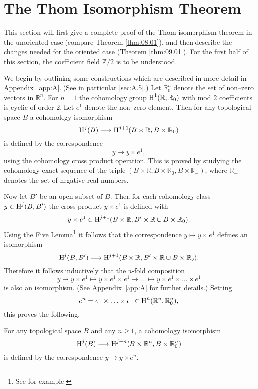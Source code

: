 \documentclass[../main]{subfiles}
\begin{document}
\chapter{The Thom Isomorphism Theorem}\label{ch:10}
This section will first give a complete proof of the Thom isomorphism theorem in the unoriented case (compare Theorem \ref{thm:08.01}), and then describe the changes needed for the oriented case (Theorem \ref{thm:09.01}). For the first half of this section, the coefficient field $\mathbb Z/2$ is to be understood.

We begin by outlining some constructions which are described in more detail in Appendix~\ref{app:A}. (See in particular \ref{sec:A.5}.) Let ${\mathbb R}^n_0$ denote the set of non--zero vectors in ${\mathbb R}^n$. For $n = 1$ the cohomology group $\operatorname{H}^1(\mathbb R, \mathbb R_0)$ with mod $2$ coefficients is cyclic of order $2$. Let $e^1$ denote the non--zero element. Then for any topological space $B$ a cohomology isomorphism \[\operatorname{H}^j(B) \longrightarrow \operatorname{H}^{j + 1}(B \times \mathbb R, B \times \mathbb R_0)\] is defined by the correspondence \[y \mapsto y \times e^1,\] using the cohomology cross product operation. This is proved by studying the cohomology exact sequence of the triple $(B \times \mathbb R, B \times \mathbb R_0, B \times \mathbb R_-)$, where $\mathbb R_-$ denotes the set of negative real numbers.

Now let $B'$ be an open subset of $B$. Then for each cohomology class \newline $y \in \operatorname{H}^j(B, B')$ the cross product $y \times e^1$ is defined with
\[y \times e^1 \in \operatorname{H}^{j + 1}(B \times \mathbb R, B' \times \mathbb R \cup B \times \mathbb R_0).\] 
Using the Five Lemma\footnote{See for example \cite[pp. 185]{spanier1981}} it follows that the correspondence $y \mapsto y \times e^1$ defines an isomorphism 
\[\operatorname{H}^j(B, B') \longrightarrow \operatorname{H}^{j + 1}(B \times \mathbb R, B' \times \mathbb R \cup B \times \mathbb R_0).\] 
Therefore it follows inductively that the $n$-fold composition
\[y \mapsto y \times e^1 \mapsto y \times e^1 \times e^1 \mapsto \ldots \mapsto y \times e^1 \times \ldots \times e^1\] 
is also an isomorphism. (See Appendix~\ref{app:A} for further details.) Setting 
\[e^n = e^1 \times \ldots \times e^1 \in \operatorname{H}^n({\mathbb R}^n, {\mathbb R}^n_0),\] this proves the following. 

\begin{lemma}
\label{lem:10.1}
For any topological space $B$ and any $n \ge 1$, a cohomology isomorphism \[\operatorname{H}^j(B) \longrightarrow \operatorname{H}^{j + n}(B \times {\mathbb R}^n, B \times {\mathbb R}^n_0)\] is defined by the correspondence $y \mapsto y \times e^n$.
\end{lemma}
\end{document}
